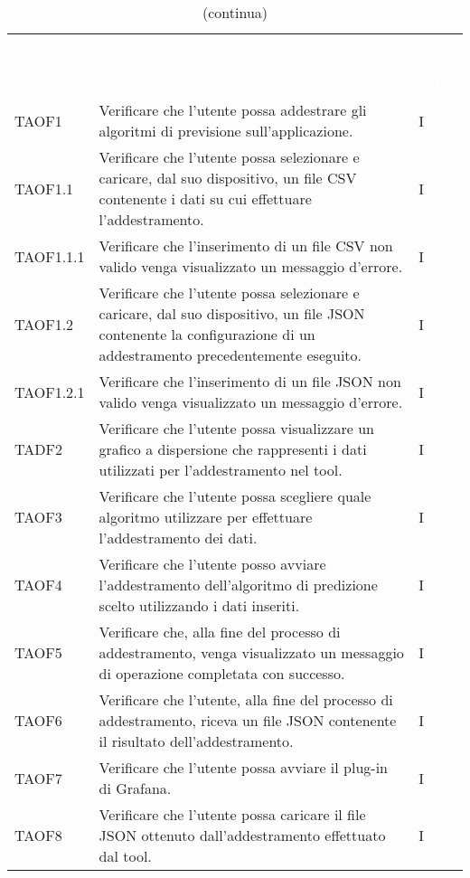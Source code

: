 \begin{longtable}{C{2.5cm} L{8cm} C{2cm}}
\caption{Tabella dei test di accettazione} \\
\textcolor{white}{\textbf{Codice}} &
\textcolor{white}{\textbf{Descrizione}} &
\textcolor{white}{\textbf{Esito}} \\
		\endfirsthead
		\caption[]{(continua)} \\
\textcolor{white}{\textbf{Codice}} &
\textcolor{white}{\textbf{Descrizione}} &
\textcolor{white}{\textbf{Esito}} \\
		\endhead
TAOF1 & Verificare che l’utente possa addestrare gli algoritmi di previsione sull’applicazione. & I \\
TAOF1.1 & Verificare che l’utente possa selezionare e caricare, dal suo dispositivo, un file CSV contenente i dati su cui effettuare l’addestramento. & I\\
TAOF1.1.1 & Verificare che l’inserimento di un file CSV non valido venga visualizzato un messaggio d’errore. & I \\
TAOF1.2 & Verificare che l’utente possa selezionare e caricare, dal suo dispositivo, un file JSON contenente la configurazione di un addestramento precedentemente eseguito. & I\\
TAOF1.2.1 & Verificare che l’inserimento di un file JSON non valido venga visualizzato un messaggio d’errore. & I \\
TADF2 & Verificare che l’utente possa visualizzare un grafico a dispersione che rappresenti i dati utilizzati per l’addestramento nel tool. & I \\
TAOF3 & Verificare che l’utente possa scegliere quale algoritmo utilizzare per effettuare l’addestramento dei dati. & I \\
TAOF4 & Verificare che l’utente posso avviare l’addestramento dell’algoritmo di predizione scelto utilizzando i dati inseriti. & I \\
TAOF5 & Verificare che, alla fine del processo di addestramento, venga visualizzato un messaggio di operazione completata con successo. & I \\
TAOF6 & Verificare che l’utente, alla fine del processo di addestramento, riceva un file JSON contenente il risultato dell’addestramento. & I\\
TAOF7 & Verificare che l’utente possa avviare il plug-in di Grafana. & I \\
TAOF8 & Verificare che l’utente possa caricare il file JSON ottenuto dall’addestramento effettuato dal tool. & I\\

\end{longtable}
